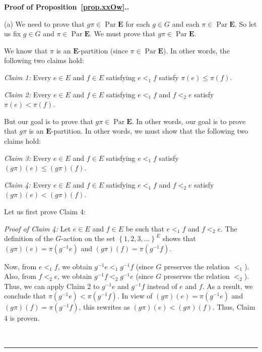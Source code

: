 \documentclass[numbers=enddot,12pt,final,onecolumn,notitlepage,abstracton]{scrartcl}
\theoremstyle{definition}
\newenvironment{proof}[1][Proof]{\noindent\textbf{#1.} }{\ \rule{0.5em}{0.5em}}
\newenvironment{verlong}{}{}
\newcommand{\Par}{\operatorname{Par}}
\newcommand{\EE}{{\mathbf{E}}}
\begin{document}
\begin{verlong}
\begin{proof}[Proof of Proposition~\ref{prop.xxOw}.]

(a) We need to prove that $g \pi \in \Par \EE$ for each $g \in G$ and
each $\pi \in \Par \EE$. So let us fix $g \in G$ and $\pi \in \Par \EE$.
We must prove that $g \pi \in \Par \EE$.

We know that $\pi$ is an $\EE$-partition (since $\pi \in \Par \EE$).
In other words, the following two claims hold:

\textit{Claim 1:} Every $e \in E$ and $f \in E$ satisfying $e <_1 f$
satisfy $\pi\left(e\right) \leq \pi\left(f\right)$.

\textit{Claim 2:} Every $e \in E$ and $f \in E$ satisfying $e <_1 f$
and $f <_2 e$ satisfy $\pi\left(e\right) < \pi\left(f\right)$.

But our goal is to prove that $g \pi \in \Par \EE$. In other words,
our goal is to prove that $g \pi$ is an $\EE$-partition. In other
words, we must show that the following two claims hold:

\textit{Claim 3:} Every $e \in E$ and $f \in E$ satisfying $e <_1 f$
satisfy
$\left(g \pi\right)\left(e\right) \leq \left(g \pi\right)\left(f\right)$.

\textit{Claim 4:} Every $e \in E$ and $f \in E$ satisfying $e <_1 f$
and $f <_2 e$ satisfy
$\left(g \pi\right)\left(e\right) < \left(g \pi\right)\left(f\right)$.

Let us first prove Claim 4:

\textit{Proof of Claim 4:} Let $e \in E$ and $f \in E$ be such that
$e <_1 f$ and $f <_2 e$. The definition of the $G$-action on the set
$\left\{1, 2, 3, \ldots\right\}^E$ shows that
$\left(g \pi\right) \left(e\right) = \pi \left(g^{-1} e\right)$ and
$\left(g \pi\right) \left(f\right) = \pi \left(g^{-1} f\right)$.

Now, from $e <_1 f$, we obtain
$g^{-1} e <_1 g^{-1} f$ (since $G$ preserves
the relation $<_1$). Also, from $f <_2 e$, we obtain
$g^{-1} f <_2 g^{-1} e$ (since $G$ preserves
the relation $<_2$). Thus, we can apply Claim 2 to
$g^{-1} e$ and $g^{-1} f$ instead of $e$ and $f$. As a result, we
conclude that
$\pi \left(g^{-1} e\right) < \pi \left(g^{-1} f\right)$. In view of
$\left(g \pi\right) \left(e\right) = \pi \left(g^{-1} e\right)$ and
$\left(g \pi\right) \left(f\right) = \pi \left(g^{-1} f\right)$, this
rewrites as
$\left(g \pi\right)\left(e\right) < \left(g \pi\right)\left(f\right)$.
Thus, Claim 4 is proven.


\end{proof}
\end{verlong}
\end{document}
